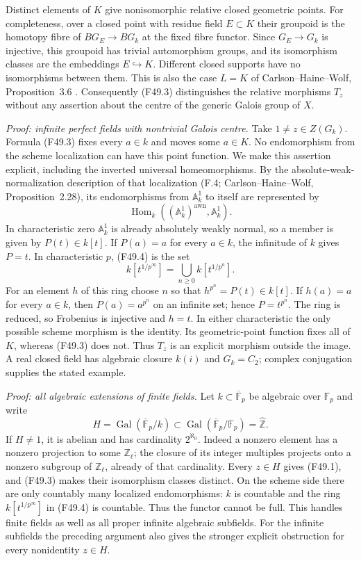 Distinct elements of $K$ give nonisomorphic relative closed geometric
points. For completeness, over a closed point with residue field
$E\subset K$ their groupoid is the homotopy fibre of
$B G_E\to B G_k$ at the fixed fibre functor. Since $G_E\to G_k$
is injective, this groupoid has trivial automorphism groups, and its
isomorphism classes are the embeddings $E\hookrightarrow K$.
Different closed supports have no isomorphisms between them.
This is also the case $L=K$ of Carlson--Haine--Wolf,
Proposition~3.6 \cite{CHW2024}. Consequently (F49.3) distinguishes
the relative morphisms $T_z$ without any assertion about the centre
of the generic Galois group of $X$.

\emph{Proof: infinite perfect fields with nontrivial Galois centre.}
Take $1\ne z\in Z(G_k)$. Formula (F49.3) fixes every $a\in k$
and moves some $a\in K$. No endomorphism from the scheme
localization can have this point function. We make this assertion
explicit, including the inverted universal homeomorphisms.
By the absolute-weak-normalization description of that localization
(F.4; Carlson--Haine--Wolf, Proposition~2.28), its endomorphisms
from $\mathbb A^1_k$ to itself are represented by
\[
 \operatorname{Hom}_k((\mathbb A^1_k)^{\mathrm{awn}},\mathbb A^1_k).
                                                               \tag{F49.4}
\]
In characteristic zero $\mathbb A^1_k$ is already absolutely weakly
normal, so a member is given by $P(t)\in k[t]$. If $P(a)=a$ for
every $a\in k$, the infinitude of $k$ gives $P=t$.
In characteristic $p$, (F49.4) is the set
\[
                  k[t^{1/p^\infty}]
                    =\bigcup_{n\geq0}k[t^{1/p^n}].
\]
For an element $h$ of this ring choose $n$ so that
$h^{p^n}=P(t)\in k[t]$. If $h(a)=a$ for every $a\in k$, then
$P(a)=a^{p^n}$ on an infinite set; hence $P=t^{p^n}$.
The ring is reduced, so Frobenius is injective and $h=t$.
In either characteristic the only possible scheme morphism is the
identity. Its geometric-point function fixes all of $K$, whereas
(F49.3) does not. Thus $T_z$ is an explicit morphism outside the
image. A real closed field has algebraic closure $k(i)$ and
$G_k=C_2$; complex conjugation supplies the stated example.

\emph{Proof: all algebraic extensions of finite fields.}
Let $k\subset\overline{\mathbb F}_p$ be algebraic over
$\mathbb F_p$ and write
\[
 H=\operatorname{Gal}(\overline{\mathbb F}_p/k)
       \subset\operatorname{Gal}(\overline{\mathbb F}_p/\mathbb F_p)
       =\widehat{\mathbb Z}.
\]
If $H\ne1$, it is abelian and has cardinality $2^{\aleph_0}$.
Indeed a nonzero element has a nonzero projection to some
$\mathbb Z_\ell$; the closure of its integer multiples projects
onto a nonzero subgroup of $\mathbb Z_\ell$, already of that
cardinality. Every $z\in H$ gives (F49.1), and (F49.3) makes
their isomorphism classes distinct. On the scheme side there are
only countably many localized endomorphisms: $k$ is countable and
the ring $k[t^{1/p^\infty}]$ in (F49.4) is countable. Thus the
functor cannot be full. This handles finite fields as well as all
proper infinite algebraic subfields. For the infinite subfields the
preceding argument also gives the stronger explicit obstruction for
every nonidentity $z\in H$.

